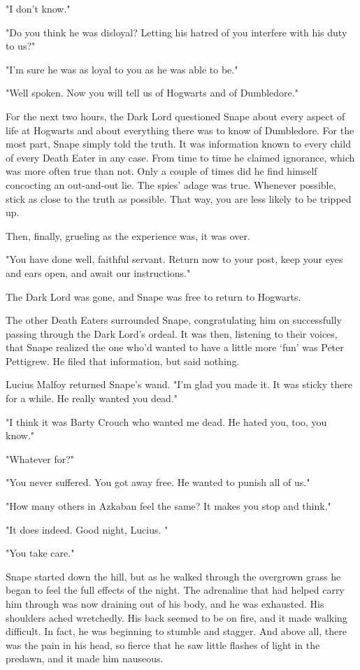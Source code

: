 "I don't know."

"Do you think he was disloyal? Letting his hatred of you interfere with his duty to us?"

"I'm sure he was as loyal to you as he was able to be."

"Well spoken. Now you will tell us of Hogwarts and of Dumbledore."

For the next two hours, the Dark Lord questioned Snape about every aspect of life at Hogwarts and about everything there was to know of Dumbledore. For the most part, Snape simply told the truth. It was information known to every child of every Death Eater in any case. From time to time he claimed ignorance, which was more often true than not. Only a couple of times did he find himself concocting an out-and-out lie. The spies' adage was true. Whenever possible, stick as close to the truth as possible. That way, you are less likely to be tripped up.

Then, finally, grueling as the experience was, it was over.

"You have done well, faithful servant. Return now to your post, keep your eyes and ears open, and await our instructions."

The Dark Lord was gone, and Snape was free to return to Hogwarts.

The other Death Eaters surrounded Snape, congratulating him on successfully passing through the Dark Lord's ordeal. It was then, listening to their voices, that Snape realized the one who'd wanted to have a little more `fun' was Peter Pettigrew. He filed that information, but said nothing.

Lucius Malfoy returned Snape's wand. "I'm glad you made it. It was sticky there for a while. He really wanted you dead."

"I think it was Barty Crouch who wanted me dead. He hated you, too, you know."

"Whatever for?"

"You never suffered. You got away free. He wanted to punish all of us."

"How many others in Azkaban feel the same? It makes you stop and think."

"It does indeed. Good night, Lucius. "

"You take care."

Snape started down the hill, but as he walked through the overgrown grass he began to feel the full effects of the night. The adrenaline that had helped carry him through was now draining out of his body, and he was exhausted. His shoulders ached wretchedly. His back seemed to be on fire, and it made walking difficult. In fact, he was beginning to stumble and stagger. And above all, there was the pain in his head, so fierce that he saw little flashes of light in the predawn, and it made him nauseous.

